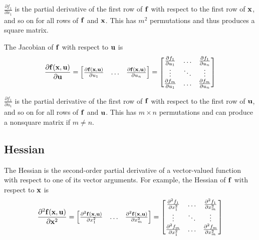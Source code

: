 $\frac{\partial f_1}{\partial x_1}$ is the partial derivative of the first row
of $\mathbf{f}$ with respect to the first row of $\mathbf{x}$, and so on for all rows
of $\mathbf{f}$ and $\mathbf{x}$. This has $m^2$ permutations and thus produces a
square matrix.

The Jacobian of $\mathbf{f}$ with respect to $\mathbf{u}$ is
\begin{equation*}
  \frac{\partial \mathbf{f}(\mathbf{x}, \mathbf{u})}{\partial \mathbf{u}} =
  \begin{bmatrix}
    \frac{\partial \mathbf{f}(\mathbf{x}, \mathbf{u})}{\partial u_1} & \hdots &
      \frac{\partial \mathbf{f}(\mathbf{x}, \mathbf{u})}{\partial u_n}
  \end{bmatrix} =
  \begin{bmatrix}
    \frac{\partial f_1}{\partial u_1} & \hdots &
      \frac{\partial f_1}{\partial u_n} \\
    \vdots & \ddots & \vdots \\
    \frac{\partial f_m}{\partial u_1} & \hdots &
      \frac{\partial f_m}{\partial u_n}
  \end{bmatrix}
\end{equation*}

$\frac{\partial f_1}{\partial u_1}$ is the partial derivative of the first row
of $\mathbf{f}$ with respect to the first row of $\mathbf{u}$, and so on for all rows
of $\mathbf{f}$ and $\mathbf{u}$. This has $m \times n$ permutations and can produce a
nonsquare matrix if $m \neq n$.

\subsection{Hessian}

The Hessian is the second-order partial derivative of a vector-valued function
with respect to one of its vector arguments. For example, the Hessian of
$\mathbf{f}$ with respect to $\mathbf{x}$ is
\begin{equation*}
  \frac{\partial^2 \mathbf{f}(\mathbf{x}, \mathbf{u})}{\partial \mathbf{x}^2} =
  \begin{bmatrix}
    \frac{\partial^2 \mathbf{f}(\mathbf{x}, \mathbf{u})}{\partial x_1^2} & \hdots &
      \frac{\partial^2 \mathbf{f}(\mathbf{x}, \mathbf{u})}{\partial x_m^2}
  \end{bmatrix} =
  \begin{bmatrix}
    \frac{\partial^2 f_1}{\partial x_1^2} & \hdots &
      \frac{\partial^2 f_1}{\partial x_m^2} \\
    \vdots & \ddots & \vdots \\
    \frac{\partial^2 f_m}{\partial x_1^2} & \hdots &
      \frac{\partial^2 f_m}{\partial x_m^2}
  \end{bmatrix}
\end{equation*}

